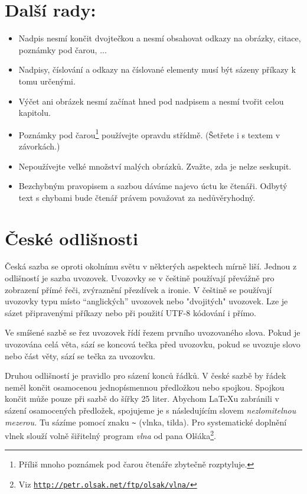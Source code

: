 \documentclass[a4paper,10pt,twocolumn]{article}
\begin{document}
\section{Další rady:}
\begin{itemize}
\item Nadpis nesmí končit dvojtečkou a nesmí obsahovat odkazy na obrázky, citace, poznámky pod čarou, ...
\\

\item Nadpisy, číslování a odkazy na číslované elementy musí být sázeny příkazy k tomu určenými.

\item Výčet ani obrázek nesmí začínat hned pod nadpisem a nesmí tvořit celou kapitolu.

\item Poznámky pod čarou\footnote{Příliš mnoho poznámek pod čarou čtenáře zbytečně rozptyluje.} používejte opravdu střídmě. (Šetřete i s textem v závorkách.)

\item Nepoužívejte velké množství malých obrázků. Zvažte, zda je nelze seskupit.

\item Bezchybným pravopisem a sazbou dáváme najevo úctu ke čtenáři. Odbytý text s chybami bude čtenář právem považovat za nedůvěryhodný.
\end{itemize}
\section{České odlišnosti}
Česká sazba se oproti okolnímu světu v některých aspektech mírně liší. Jednou z odlišností je sazba uvozovek. Uvozovky se v češtině používají převážně pro zobrazení přímé řeči, zvýraznění přezdívek a ironie. V češtině se používají uvozovky typu  místo ``anglických'' uvozovek nebo "dvojitých" uvozovek. Lze je sázet připravenými příkazy nebo při použití UTF-8 kódování i přímo.

Ve smíšené sazbě se řez uvozovek řídí řezem prvního uvozovaného slova. Pokud je uvozována celá věta, sází se koncová tečka před uvozovku, pokud se uvozuje slovo nebo část věty, sází se tečka za uvozovku.

Druhou odlišností je pravidlo pro sázení konců řádků. V české sazbě by řádek neměl končit osamocenou jednopísmennou předložkou nebo spojkou. Spojkou  končit může pouze při sazbě do šířky 25 liter. Abychom \LaTeX u zabránili v sázení osamocených předložek, spojujeme je s následujícím slovem \textit{nezlomitelnou mezerou.} Tu sázíme pomocí znaku \verb|~| (vlnka, tilda). Pro systematické doplnění vlnek slouží volně šiřitelný program \textit{vlna} od pana Olšáka\footnote{Viz \href{http://petr.olsak.net/ftp/olsak/vlna/}{\nolinkurl{http://petr.olsak.net/ftp/olsak/vlna/}}}.
\end{document}
